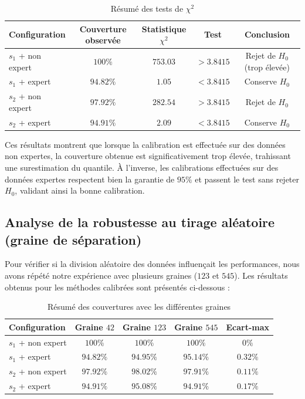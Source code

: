 \documentclass[a4paper,12pt]{article}
\begin{document}
\begin{table}[H]
    \centering
    \begin{tabular}{|l|c|c|c|c|}
        \hline
        \textbf{Configuration} & \textbf{Couverture observée} & \textbf{Statistique $\chi^2$} & \textbf{Test} & \textbf{Conclusion} \\
        \hline
        $s_1$ + non expert & $100\%$ & $753.03$ & $> 3.8415$ & Rejet de $H_0$ (trop élevée) \\
        $s_1$ + expert & $94.82\%$ & $1.05$ & $< 3.8415$  & Conserve $H_0$ \\
        $s_2$ + non expert & $97.92\%$ & $282.54$ & $> 3.8415$ & Rejet de $H_0$ \\
        $s_2$ + expert & $94.91\%$ & $2.09$ & $< 3.8415$ & Conserve $H_0$ \\
        \hline
    \end{tabular}
    \caption{Résumé des tests de $\chi^2$}
    \label{tab:Tests du Chi-2}
\end{table}

Ces résultats montrent que lorsque la calibration est effectuée sur des données non expertes, la couverture obtenue est significativement trop élevée, trahissant une surestimation du quantile. À l’inverse, les calibrations effectuées sur des données expertes respectent bien la garantie de $95\%$ et passent le test sans rejeter $H_0$, validant ainsi la bonne calibration.

\subsection{Analyse de la robustesse au tirage aléatoire (graine de séparation)}

Pour vérifier si la division aléatoire des données influençait les performances, nous avons répété notre expérience avec plusieurs graines  ($123$ et $545$). Les résultats obtenus pour les méthodes calibrées sont présentés ci-dessous :

\begin{table}[h]
    \centering
    \begin{tabular}{|l|c|c|c|c|}
        \hline
        \textbf{Configuration} & \textbf{Graine $42$} & \textbf{Graine $123$} & \textbf{Graine $545$} & \textbf{Ecart-max} \\
        \hline
        $s_1$ + non expert & $100\%$ & $100\%$ & $100\%$ & $0\%$ \\
        $s_1$ + expert & $94.82\%$ & $94.95\%$ & $95.14\%$ & $0.32\%$ \\
        $s_2$ + non expert & $97.92\%$ & $98.02\%$ & $97.91\%$ & $0.11\%$ \\
        $s_2$ + expert & $94.91\%$ & $95.08\%$ & $94.91\%$ & $0.17\%$ \\
        \hline
    \end{tabular}
    \caption{Résumé des couvertures avec les différentes graines}
    \label{tab:couvertures_graines}
\end{table}
\end{document}
